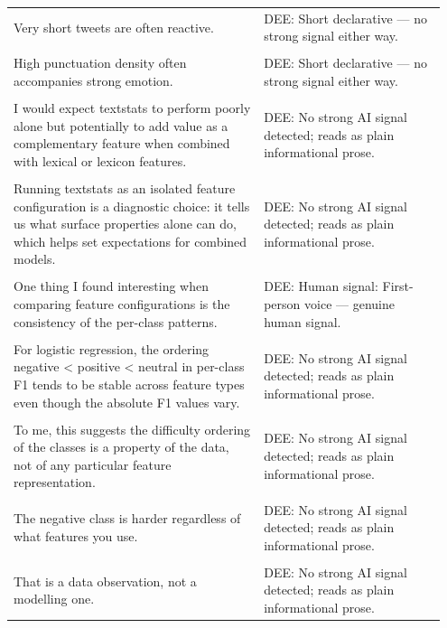 \documentclass[11pt]{article}
\begin{document}
\begin{longtable}{|p{0.55\linewidth}|p{0.40\linewidth}|}
\hline
\rule{0pt}{3.5cm} & \\
\hline
Very short tweets are often reactive. & DEE: Short declarative --- no strong signal either way. \\[2pt]
\hline
\rule{0pt}{3.5cm} & \\
\hline
High punctuation density often accompanies strong emotion. & DEE: Short declarative --- no strong signal either way. \\[2pt]
\hline
\rule{0pt}{3.5cm} & \\
\hline
I would expect textstats to perform poorly alone but potentially to add value as a complementary feature when combined with lexical or lexicon features. & DEE: No strong AI signal detected; reads as plain informational prose. \\[2pt]
\hline
\rule{0pt}{3.5cm} & \\
\hline
Running textstats as an isolated feature configuration is a diagnostic choice: it tells us what surface properties alone can do, which helps set expectations for combined models. & DEE: No strong AI signal detected; reads as plain informational prose. \\[2pt]
\hline
\rule{0pt}{3.5cm} & \\
\hline
One thing I found interesting when comparing feature configurations is the consistency of the per-class patterns. & DEE: Human signal: First-person voice --- genuine human signal. \\[2pt]
\hline
\rule{0pt}{3.5cm} & \\
\hline
For logistic regression, the ordering negative < positive < neutral in per-class F1 tends to be stable across feature types even though the absolute F1 values vary. & DEE: No strong AI signal detected; reads as plain informational prose. \\[2pt]
\hline
\rule{0pt}{3.5cm} & \\
\hline
To me, this suggests the difficulty ordering of the classes is a property of the data, not of any particular feature representation. & DEE: No strong AI signal detected; reads as plain informational prose. \\[2pt]
\hline
\rule{0pt}{3.5cm} & \\
\hline
The negative class is harder regardless of what features you use. & DEE: No strong AI signal detected; reads as plain informational prose. \\[2pt]
\hline
\rule{0pt}{3.5cm} & \\
\hline
That is a data observation, not a modelling one. & DEE: No strong AI signal detected; reads as plain informational prose. \\[2pt]

\end{longtable}
\end{document}
